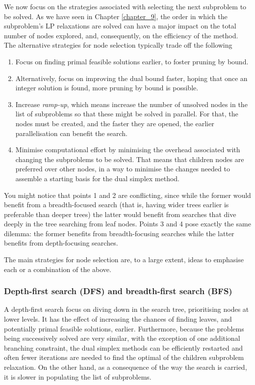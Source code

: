 We now focus on the strategies associated with selecting the next subproblem to be solved. As we have seen in Chapter \ref{chapter_9}, the order in which the subproblem's LP relaxations are solved can have a major impact on the total number of nodes explored, and, consequently, on the efficiency of the method. The alternative strategies for node selection typically trade off the following
%
\begin{enumerate}
	\item Focus on finding primal feasible solutions earlier, to foster pruning by bound.
	\item Alternatively, focus on improving the dual bound faster, hoping that once an integer solution is found, more pruning by bound is possible.
	\item Increase \emph{ramp-up}, which means increase the number of unsolved nodes in the list of subproblems so that these might be solved in parallel. For that, the nodes must be created, and the faster they are opened, the earlier parallelisation	can benefit the search.
	\item Minimise computational effort by minimising the overhead associated with changing the subproblems to be solved. That means that children nodes are preferred over other nodes, in a way to minimise the changes needed to assemble a starting basis for the dual simplex method.
\end{enumerate}

You might notice that points 1 and 2 are conflicting, since while the former would benefit from a breadth-focused search (that is, having wider trees earlier is preferable than deeper trees) the latter would benefit from searches that dive deeply in the tree searching from leaf nodes. Points 3 and 4 pose exactly the same dilemma: the former benefits from breadth-focusing searches while the latter benefits from depth-focusing searches.

The main strategies for node selection are, to a large extent, ideas to emphasise each or a combination of the above. 

\subsubsection{Depth-first search (DFS) and breadth-first search (BFS)}

A depth-first search focus on diving down in the search tree, prioritising nodes at lower levels. It has the effect of increasing the chances of finding leaves, and potentially primal feasible solutions, earlier. Furthermore, because the problems being successively solved are very similar, with the exception of one additional branching constraint, the dual simplex methods can be efficiently restarted and often fewer iterations are needed to find the optimal of the children subproblem relaxation. On the other hand, as a consequence of the way the search is carried, it is slower in populating the list of subproblems. 

